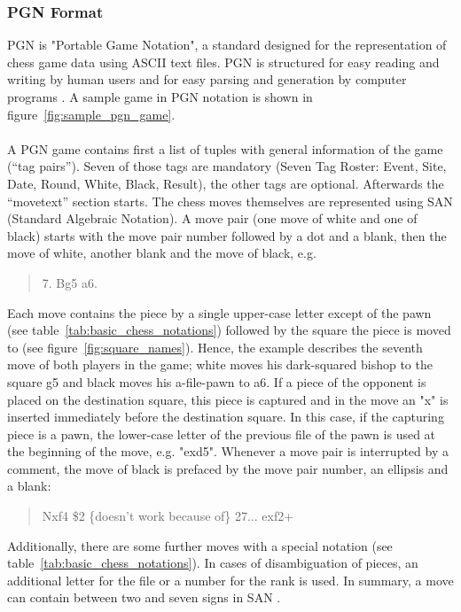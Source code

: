 \documentclass[article,type=msc,colorback,accentcolor=tud7b]{tudthesis}
\begin{document}
  \subsubsection{PGN Format}
    PGN is "Portable Game Notation", a standard designed for the representation of chess game data using ASCII text files. PGN is structured for easy reading and writing by human users and for easy parsing and generation by computer programs \autocite[chapter~1]{Edwards1994}. A sample game in PGN notation is shown in figure~\ref{fig:sample_pgn_game}. \\\\
    A PGN game contains first a list of tuples with general information of the game (“tag pairs”). Seven of those tags are mandatory (Seven Tag Roster: Event, Site, Date, Round, White, Black, Result), the other tags are optional. Afterwards the “movetext” section starts. The chess moves themselves are represented using SAN (Standard Algebraic Notation). A move pair (one move of white and one of black) starts with the move pair number followed by a dot and a blank, then the move of white, another blank and the move of black, e.g. 
    \begin{quotation}
      7. Bg5 a6.
    \end{quotation}    
    Each move contains the piece by a single upper-case letter except of the pawn (see table~\ref{tab:basic_chess_notations}) followed by the square the piece is moved to (see figure~\ref{fig:square_names}). Hence, the example describes the seventh move of both players in the game; white moves his dark-squared bishop to the square g5 and black moves his a-file-pawn to a6. If a piece of the opponent is placed on the destination square, this piece is captured and in the move an "x" is inserted immediately before the destination square. In this case, if the capturing piece is a pawn, the lower-case letter of the previous file of the pawn is used at the beginning of the move, e.g. "exd5". Whenever a move pair is interrupted by a comment, the move of black is prefaced by the move pair number, an ellipsis and a blank: 
    \begin{quotation}
      Nxf4 \$2 \{doesn't work because of\} 27... exf2+
    \end{quotation}
    Additionally, there are some further moves with a special notation (see table~\ref{tab:basic_chess_notations}). In cases of disambiguation of pieces, an additional letter for the file or a number for the rank is used. In summary, a move can contain between two and seven signs in SAN \autocite[chapter~8]{Edwards1994}.
	
\end{document}
